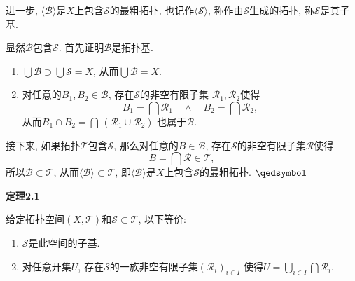 进一步, $\langle\mathcal{B}\rangle$是$X$上包含$\mathcal{S}$的最粗拓扑,
也记作$\langle\mathcal{S}\rangle$, 称作由$\mathcal{S}$生成的拓扑,
称$\mathcal{S}$是其子基.


显然$\mathcal{B}$包含$\mathcal{S}$. 首先证明$\mathcal{B}$是拓扑基.


\begin{enumerate}
    \item $\displaystyle\bigcup\mathcal{B}\supset\bigcup\mathcal{S}=X$,
    从而$\displaystyle\bigcup\mathcal{B}=X$.
    \vspace{3pt}
    \item 对任意的$B_1,B_2\in\mathcal{B}$, 存在$\mathcal{S}$的非空有限子集
    $\mathcal{R}_1,\mathcal{R}_2$使得
    \[
        B_1=\bigcap\mathcal{R}_1\quad\land\quad B_2=\bigcap\mathcal{R}_2,
    \]
    从而$\displaystyle B_1\cap B_2=\bigcap\,(\mathcal{R}_1\cup\mathcal{R}_2)$
    也属于$\mathcal{B}$.
\end{enumerate}

\vspace{3pt}
接下来, 如果拓扑$\mathcal{T}$包含$\mathcal{S}$,
那么对任意的$B\in\mathcal{B}$, 存在$\mathcal{S}$的非空有限子集$\mathcal{R}$使得
\[
    B=\bigcap\mathcal{R}\in\mathcal{T},
\]
所以$\mathcal{B}\subset\mathcal{T}$,
从而$\langle\mathcal{B}\rangle\subset\mathcal{T}$,
即$\langle\mathcal{B}\rangle$是$X$上包含$\mathcal{S}$的最粗拓扑. \hfill $\qedsymbol$


\vspace{10pt}

\hypertarget{sec:定理2.1}{}
\noindent\textbf{定理2.1}

给定拓扑空间$(X,\mathcal{T})$和$\mathcal{S}\subset\mathcal{T}$, 以下等价:
\begin{enumerate}
    \item $\mathcal{S}$是此空间的子基.
    \vspace{3pt}
    \item 对任意开集$U$, 存在$\mathcal{S}$的一族非空有限子集$(\mathcal{R}_i)_{i\in I}$
    使得$\displaystyle U=\bigcup_{i\in I}\bigcap\mathcal{R}_i$.
\end{enumerate}

